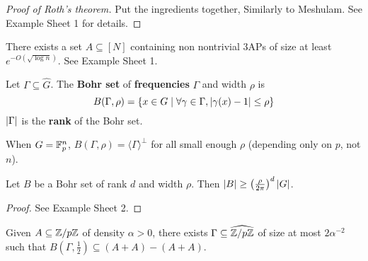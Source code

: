 \documentclass{article}
\begin{document}
\begin{proof}[Proof of Roth's theorem]
  Put the ingredients together, Similarly to Meshulam. See Example Sheet 1 for details.
\end{proof}

\begin{nex}
  There exists a set $A \subseteq [N]$ containing non nontrivial 3APs of size at least $e^{-O(\sqrt{\log n})}$. See Example Sheet 1.
\end{nex}

\begin{ndef}
  Let $\Gamma \subseteq \hat G$. The {\bf Bohr set} of {\bf frequencies} $\Gamma$ and width $\rho$ is
  $$B(\Gamma, \rho) = \{x \in G \mid \forall \gamma \in \Gamma, \left\lvert \gamma(x) - 1\right\rvert \le \rho\}$$
  $\left\lvert \Gamma\right\rvert$ is the {\bf rank} of the Bohr set.
\end{ndef}

\begin{nex}
  When $G = \mathbb F_p^n$, $B(\Gamma, \rho) = \langle\Gamma\rangle^\perp$ for all small enough $\rho$ (depending only on $p$, not $n$).
\end{nex}

\begin{nlemma}
  Let $B$ be a Bohr set of rank $d$ and width $\rho$. Then $\left\lvert B\right\rvert \ge \left(\frac\rho{2\pi}\right)^d\left\lvert G\right\rvert$.
\end{nlemma}
\begin{proof}
  See Example Sheet 2.
\end{proof}

\begin{nlemma}[Bogolyubov]
  Given $A \subseteq \mathbb Z/p\mathbb Z$ of density $\alpha > 0$, there exists $\Gamma \subseteq \widehat{\mathbb Z/p\mathbb Z}$ of size at most $2\alpha^{-2}$ such that $B(\Gamma, \frac 12) \subseteq (A + A) - (A + A)$.
\end{nlemma}
\end{document}
